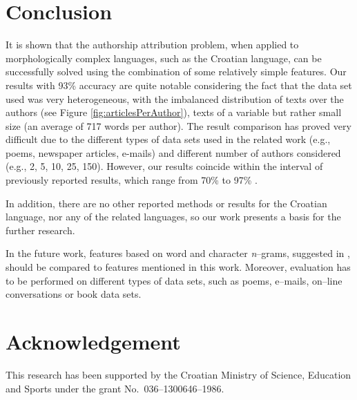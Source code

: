 \documentclass{llncs}
\begin{document}
\section{Conclusion}
It is shown that the authorship attribution problem, when applied to morphologically complex
languages, such as the Croatian language, can be successfully solved using the
combination of some relatively simple features. Our results with 93\% accuracy
are quite notable considering the fact that the data set used was very
heterogeneous, with the imbalanced distribution of texts over the authors (see
Figure \ref{fig:articlesPerAuthor}), texts of a variable but rather small size (an average of 717
words per author). The result comparison has proved very difficult due to the different types of data sets used
in the related work (e.g., poems, newspaper articles, e-mails) and different
number of authors considered (e.g., 2, 5, 10, 25, 150). However, our results
coincide within the interval of previously reported results, which range from
70\% to 97\%
\cite{coyotl2006authorship,keselj2003n,luyckx2005shallow,stamatatos2001computer}.

In addition, there are no other reported methods or results for the Croatian
language, nor any of the related languages, so our work presents a basis for
the further research.

In the future work, features based on word and character \emph{n}--grams,
suggested in \cite{keselj2003n,peng2003language,coyotl2006authorship}, should
be compared to features mentioned in this work. Moreover, evaluation has
to be performed on different types of data sets, such as poems, e--mails,
on--line conversations or book data sets.


\section*{Acknowledgement}
This research has been supported by the Croatian Ministry of Science, Education
and Sports under the grant No.~036--1300646--1986.



\end{document}
